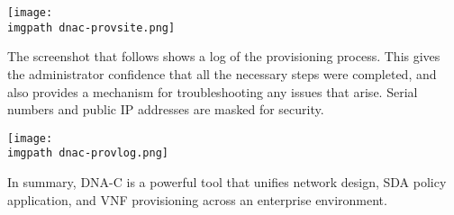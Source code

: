     \begin{minipage}[t]{\linewidth}
	  \centering
      \texttt{[image: \\imgpath dnac-provsite.png]}
    \end{minipage}

The screenshot that follows shows a log of the provisioning process. This
gives the administrator confidence that all the necessary steps were
completed, and also provides a mechanism for troubleshooting any issues that
arise. Serial numbers and public IP addresses are masked for security.

    \begin{minipage}[t]{\linewidth}
	  \centering
      \texttt{[image: \\imgpath dnac-provlog.png]}
    \end{minipage}

In summary, DNA-C is a powerful tool that unifies network design, SDA policy
application, and VNF provisioning across an enterprise environment.

